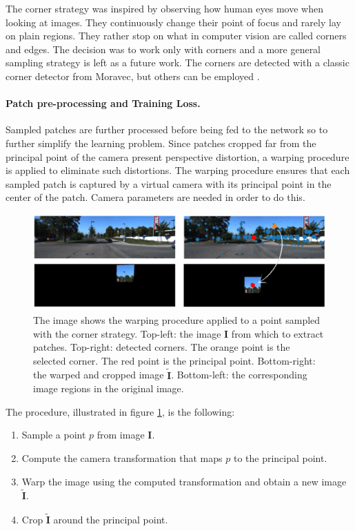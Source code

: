 The corner strategy was inspired by observing how human eyes move when looking at images.
They continuously change their point of focus and rarely lay on plain regions.
They rather stop on what in computer vision are called corners and edges.
The decision was to work only with corners and a more general sampling strategy is left as a future work.
The corners are detected with a classic corner detector from Moravec, but others can be employed \cite{computer_vision}.

\paragraph{Patch pre-processing and Training Loss.}
Sampled patches are further processed before being fed to the network so to further simplify the learning problem.
Since patches cropped far from the principal point of the camera present perspective distortion, a warping procedure is applied to eliminate such distortions.
The warping procedure ensures that each sampled patch is captured by a virtual camera with its principal point in the center of the patch.
Camera parameters are needed in order to do this.
\begin{figure}
    \centering
    \includegraphics[scale=0.4]{figs/warping}
    \caption{
        The image shows the warping procedure applied to a point sampled with the corner strategy.
        Top-left: the image $\mathbf{I}$ from which to extract patches.
        Top-right: detected corners. The orange point is the selected corner. The red point is the principal point.
        Bottom-right: the warped and cropped image $\tilde{\mathbf{I}}$.
        Bottom-left: the corresponding image regions in the original image.
        \label{fig:warping}
    }
\end{figure}
The procedure, illustrated in figure \ref{fig:warping}, is the following:
\begin{enumerate}
    \item{Sample a point $p$ from image $\mathbf{I}$.}
    \item{Compute the camera transformation that maps $p$ to the principal point.}
    \item{Warp the image using the computed transformation and obtain a new image $\tilde{\mathbf{I}}$.}
    \item{Crop $\tilde{\mathbf{I}}$ around the principal point.}
\end{enumerate}
